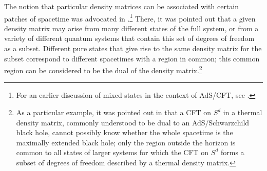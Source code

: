 \documentclass[12pt]{article}
\renewcommand{\(}{\left(}
\renewcommand{\)}{\right)}
\begin{document}
The notion that particular density matrices can be associated with certain patches of spacetime was advocated in \cite{VanRaamsdonk:2009ar}.\footnote{For an earlier discussion of mixed states in the context of AdS/CFT, see \cite{fhmmrs}.} There, it was pointed out that a given density matrix may arise from many different states of the full system, or from a variety of different quantum systems that contain this set of degrees of freedom as a subset. Different pure states that give rise to the same density matrix for the subset correspond to different spacetimes with a region in common; this common region can be considered to be the dual of the density matrix.\footnote{As a particular example, it was pointed out in \cite{VanRaamsdonk:2009ar} that a CFT on $S^d$ in a thermal density matrix, commonly understood to be dual to an AdS/Schwarzchild black hole, cannot possibly know whether the whole spacetime is the maximally extended black hole; only the region outside the horizon is common to all states of larger systems for which the CFT on $S^d$ forms a subset of degrees of freedom described by a thermal density matrix.}
\end{document}
